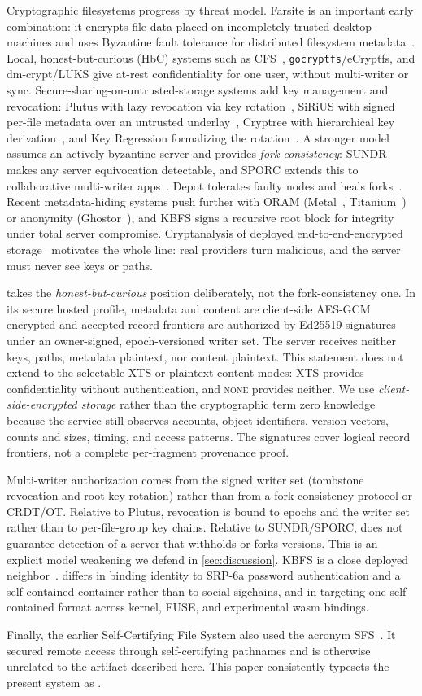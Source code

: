 Cryptographic filesystems progress by threat model. Farsite is an important
early combination: it encrypts file data placed on incompletely trusted desktop
machines and uses Byzantine fault tolerance for distributed filesystem
metadata~\citep{Adya2002Farsite}. Local, honest-but-curious
(HbC) systems such as CFS~\citep{Blaze1993CFS}, \texttt{gocryptfs}/eCryptfs,
and dm-crypt/LUKS give at-rest confidentiality for one user, without multi-writer
or sync. Secure-sharing-on-untrusted-storage systems add key management and
revocation: Plutus with lazy revocation via key
rotation~\citep{Kallahalla2003Plutus}, SiRiUS with signed per-file metadata over
an untrusted underlay~\citep{Goh2003SiRiUS}, Cryptree with hierarchical key
derivation~\citep{Grolimund2006Cryptree}, and Key Regression formalizing the
rotation~\citep{Fu2006KeyRegression}. A stronger model assumes an actively
byzantine server and provides \emph{fork consistency}: SUNDR~\citep{Li2004SUNDR}
makes any server equivocation detectable, and SPORC extends this to collaborative
multi-writer apps~\citep{Feldman2010SPORC}. Depot tolerates faulty nodes and
heals forks~\citep{Mahajan2011Depot}. Recent metadata-hiding systems push
further with ORAM (Metal~\citep{Chen2020Metal}, Titanium~\citep{Chen2022Titanium})
or anonymity (Ghostor~\citep{Hu2020Ghostor}), and KBFS signs a recursive root
block for integrity under total server compromise. Cryptanalysis of deployed
end-to-end-encrypted storage~\citep{Backendal2023MEGA, Backendal2024BrokenEcosystem}
motivates the whole line: real providers turn malicious, and the server must
never see keys or paths.

\sfs{} takes the \emph{honest-but-curious} position deliberately, not the
fork-consistency one.  In its secure hosted profile, metadata and content are
client-side AES-GCM encrypted and accepted record frontiers are authorized by
Ed25519 signatures under an owner-signed, epoch-versioned writer set.  The
server receives neither keys, paths, metadata plaintext, nor content plaintext.
This statement does not extend to the selectable XTS or plaintext content
modes: XTS provides confidentiality without authentication, and \textsc{none}
provides neither.  We use \emph{client-side-encrypted storage} rather than the
cryptographic term zero knowledge because the service still observes accounts,
object identifiers, version vectors, counts and sizes, timing, and access
patterns.  The signatures cover logical record frontiers, not a complete
per-fragment provenance proof.

Multi-writer authorization comes from the signed writer set (tombstone
revocation and root-key rotation) rather than from a
fork-consistency protocol or CRDT/OT. Relative to Plutus, revocation is bound to
epochs and the writer set rather than to per-file-group key chains. Relative to
SUNDR/SPORC, \sfs{} does not guarantee detection of a server that withholds or
forks versions. This is an explicit model weakening we defend in \cref{sec:discussion}.
KBFS is a close deployed neighbor~\citep{KeybaseKBFS}. \sfs{} differs in
binding identity to SRP-6a password authentication and a self-contained
container rather than to social sigchains, and in targeting one self-contained
format across kernel, FUSE, and experimental wasm bindings.

Finally, the earlier Self-Certifying File System also used the acronym
SFS~\citep{Fu2000SFS}.  It secured remote access through self-certifying
pathnames and is otherwise unrelated to the artifact described here.  This
paper consistently typesets the present system as \sfs{}.
